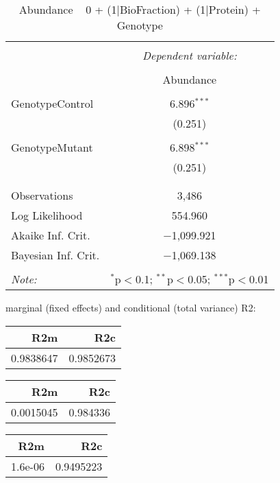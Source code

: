 \documentclass[11pt]{report}
\begin{document}
\begin{table}[!htbp] \centering 
  \caption{Abundance ~ 0 + (1|BioFraction) + (1|Protein) + Genotype} 
  \label{} 
\begin{tabular}{@{\extracolsep{5pt}}lc} 
\\[-1.8ex]\hline 
\hline \\[-1.8ex] 
 & \multicolumn{1}{c}{\textit{Dependent variable:}} \\ 
\cline{2-2} 
\\[-1.8ex] & Abundance \\ 
\hline \\[-1.8ex] 
 GenotypeControl & 6.896$^{***}$ \\ 
  & (0.251) \\ 
  & \\ 
 GenotypeMutant & 6.898$^{***}$ \\ 
  & (0.251) \\ 
  & \\ 
\hline \\[-1.8ex] 
Observations & 3,486 \\ 
Log Likelihood & 554.960 \\ 
Akaike Inf. Crit. & $-$1,099.921 \\ 
Bayesian Inf. Crit. & $-$1,069.138 \\ 
\hline 
\hline \\[-1.8ex] 
\textit{Note:}  & \multicolumn{1}{r}{$^{*}$p$<$0.1; $^{**}$p$<$0.05; $^{***}$p$<$0.01} \\ 
\end{tabular} 
\end{table} 
marginal (fixed effects) and conditional (total variance) R2:

\begin{tabular}{r|r}
\hline
R2m & R2c\\
\hline
0.9838647 & 0.9852673\\
\hline
\end{tabular}

\begin{tabular}{r|r}
\hline
R2m & R2c\\
\hline
0.0015045 & 0.984336\\
\hline
\end{tabular}

\begin{tabular}{r|r}
\hline
R2m & R2c\\
\hline
1.6e-06 & 0.9495223\\
\hline
\end{tabular}
\end{document}
